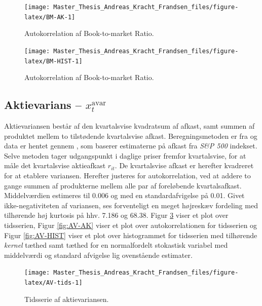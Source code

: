 \documentclass[
  a4paper,
  oneside]{memoir}
\begin{document}
\begin{figure}[htbp!]

{\centering \texttt{[image: Master\_Thesis\_Andreas\_Kracht\_Frandsen\_files/figure-latex/BM-AK-1]} 

}

\caption{Autokorrelation af Book-to-market Ratio.}\label{fig:BM-AK}
\end{figure}

\begin{figure}[htbp!]

{\centering \texttt{[image: Master\_Thesis\_Andreas\_Kracht\_Frandsen\_files/figure-latex/BM-HIST-1]} 

}

\caption{Autokorrelation af Book-to-market Ratio.}\label{fig:BM-HIST}
\end{figure}

\hypertarget{aktievarians-x_ttextavar}{%
\subsection{\texorpdfstring{Aktievarians -- \(x_t^{\text{avar}}\)}{Aktievarians -- x\_t\^{}\{\textbackslash text\{avar\}\}}}\label{aktievarians-x_ttextavar}}

Aktievariansen består af den kvartalsvise kvadratsum af afkast, samt summen af produktet mellem to tilstødende kvartalsvise afkast. Beregningsmetoden er fra \citep{Schwert1987} og data er hentet gennem \citep{Goyal2007}, som baserer estimaterne på afkast fra \emph{S\&P 500} indekset. Selve metoden tager udgangspunkt i daglige priser fremfor kvartalsvise, for at måle det kvartalsvise aktieafkast \(r_{it}\). De kvartalsvise afkast er herefter kvadreret for at etablere variansen. Herefter justeres for autokorrelation, ved at addere to gange summen af produkterne mellem alle par af foreløbende kvartalsafkast. Middelværdien estimeres til 0.006 og med en standardafvigelse på 0.01. Givet ikke-negativiteten af variansen, ses forventeligt en meget højreskæv fordeling med tilhørende høj kurtosis på hhv. 7.186 og 68.38. Figur \ref{fig:AV-tids} viser et plot over tidsserien, Figur \ref{fig:AV-AK} viser et plot over autokorrelationen for tidsserien og Figur \ref{fig:AV-HIST} viser et plot over histogrammet for tidsserien med tilhørende \emph{kernel} tæthed samt tæthed for en normalfordelt stokastisk variabel med middelværdi og standard afvigelse lig ovenstående estimater.

\begin{figure}[htbp!]

{\centering \texttt{[image: Master\_Thesis\_Andreas\_Kracht\_Frandsen\_files/figure-latex/AV-tids-1]} 

}

\caption{Tidsserie af aktievariansen.}\label{fig:AV-tids}
\end{figure}
\end{document}
